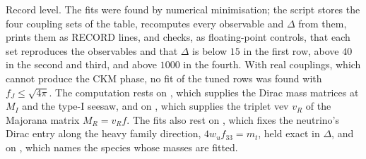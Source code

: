 Record level. The fits were found by numerical minimisation; the script stores the four coupling sets of the table, recomputes every observable and $\Delta$ from them, prints them as RECORD lines, and checks, as floating-point controls, that each set reproduces the observables and that $\Delta$ is below $15$ in the first row, above $40$ in the second and third, and above $1000$ in the fourth. With real couplings, which cannot produce the CKM phase, no fit of the tuned rows was found with $f_{J} \le \sqrt{4\pi}$. The computation rests on , which supplies the Dirac mass matrices at $M_{I}$ and the type-I seesaw, and on , which supplies the triplet vev $v_{R}$ of the Majorana matrix $M_{R} = v_{R}f$. The fits also rest on , which fixes the neutrino's Dirac entry along the heavy family direction, $4w_{u}f_{33} = m_{t}$, held exact in $\Delta$, and on , which names the species whose masses are fitted.

